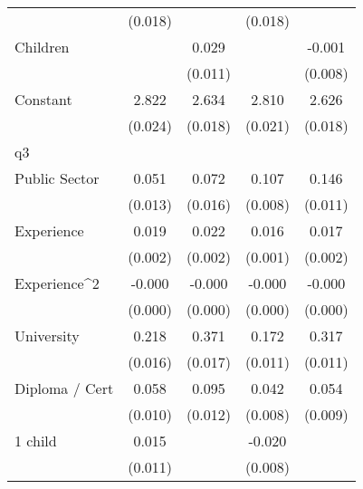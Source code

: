 {\begin{tabular}{l*{4}{c}}
                    &     (0.018)         &                     &     (0.018)         &                     \\
Children            &                     &       0.029\sym{***}&                     &      -0.001         \\
                    &                     &     (0.011)         &                     &     (0.008)         \\
Constant            &       2.822\sym{***}&       2.634\sym{***}&       2.810\sym{***}&       2.626\sym{***}\\
                    &     (0.024)         &     (0.018)         &     (0.021)         &     (0.018)         \\
\hline
q3                  &                     &                     &                     &                     \\
Public Sector       &       0.051\sym{***}&       0.072\sym{***}&       0.107\sym{***}&       0.146\sym{***}\\
                    &     (0.013)         &     (0.016)         &     (0.008)         &     (0.011)         \\
Experience          &       0.019\sym{***}&       0.022\sym{***}&       0.016\sym{***}&       0.017\sym{***}\\
                    &     (0.002)         &     (0.002)         &     (0.001)         &     (0.002)         \\
Experience^{2}      &      -0.000\sym{***}&      -0.000\sym{***}&      -0.000\sym{***}&      -0.000\sym{***}\\
                    &     (0.000)         &     (0.000)         &     (0.000)         &     (0.000)         \\
University          &       0.218\sym{***}&       0.371\sym{***}&       0.172\sym{***}&       0.317\sym{***}\\
                    &     (0.016)         &     (0.017)         &     (0.011)         &     (0.011)         \\
Diploma / Cert      &       0.058\sym{***}&       0.095\sym{***}&       0.042\sym{***}&       0.054\sym{***}\\
                    &     (0.010)         &     (0.012)         &     (0.008)         &     (0.009)         \\
1 child             &       0.015         &                     &      -0.020\sym{***}&                     \\
                    &     (0.011)         &                     &     (0.008)         &                     \\

\end{tabular}}
